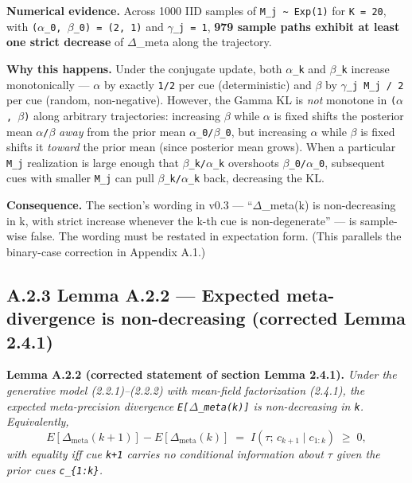 \documentclass{article}
\begin{document}
\textbf{Numerical evidence.} Across 1000 IID samples of
\texttt{M\_j\ \textasciitilde{}\ Exp(1)} for \texttt{K\ =\ 20}, with
\texttt{(\ensuremath{\alpha}\_0\textquotesingle{},\ \ensuremath{\beta}\_0\textquotesingle{})\ =\ (2,\ 1)}
and \texttt{\ensuremath{\gamma}\_j\ =\ 1}, \textbf{979 sample paths exhibit at least one
strict decrease} of \ensuremath{\Delta}\_meta along the trajectory.

\textbf{Why this happens.} Under the conjugate update, both
\texttt{\ensuremath{\alpha}\_k} and \texttt{\ensuremath{\beta}\_k} increase monotonically --- \texttt{\ensuremath{\alpha}} by
exactly \texttt{1/2} per cue (deterministic) and \texttt{\ensuremath{\beta}} by
\texttt{\ensuremath{\gamma}\_j\ M\_j\ /\ 2} per cue (random, non-negative). However, the
Gamma KL is \emph{not} monotone in \texttt{(\ensuremath{\alpha},\ \ensuremath{\beta})} along arbitrary
trajectories: increasing \texttt{\ensuremath{\beta}} while \texttt{\ensuremath{\alpha}} is fixed shifts the
posterior mean \texttt{\ensuremath{\alpha}/\ensuremath{\beta}} \emph{away} from the prior mean
\texttt{\ensuremath{\alpha}\_0/\ensuremath{\beta}\_0}, but increasing \texttt{\ensuremath{\alpha}} while \texttt{\ensuremath{\beta}} is fixed
shifts it \emph{toward} the prior mean (since posterior mean grows).
When a particular \texttt{M\_j} realization is large enough that
\texttt{\ensuremath{\beta}\_k/\ensuremath{\alpha}\_k} overshoots \texttt{\ensuremath{\beta}\_0/\ensuremath{\alpha}\_0}, subsequent cues with
smaller \texttt{M\_j} can pull \texttt{\ensuremath{\beta}\_k/\ensuremath{\alpha}\_k} back, decreasing the
KL.

\textbf{Consequence.} The section's wording in v0.3 --- ``\ensuremath{\Delta}\_meta(k) is
non-decreasing in k, with strict increase whenever the k-th cue is
non-degenerate'' --- is sample-wise false. The wording must be restated
in expectation form. (This parallels the binary-case correction in
Appendix A.1.)

\subsection{A.2.3 Lemma A.2.2 --- Expected meta-divergence is
non-decreasing (corrected Lemma
2.4.1)}\label{a.2.3-lemma-a.2.2-expected-meta-divergence-is-non-decreasing-corrected-lemma-2.4.1}

\textbf{Lemma A.2.2 (corrected statement of section Lemma 2.4.1).}
\emph{Under the generative model (2.2.1)--(2.2.2) with mean-field
factorization (2.4.1), the expected meta-precision divergence
\texttt{E{[}\ensuremath{\Delta}\_meta(k){]}} is non-decreasing in \texttt{k}.
Equivalently,} \[
E[\Delta_{\mathrm{meta}}(k+1)] - E[\Delta_{\mathrm{meta}}(k)] \;=\; I(\tau;\, c_{k+1} \mid c_{1:k}) \;\geq\; 0,
\] \emph{with equality iff cue \texttt{k+1} carries no conditional
information about \texttt{\ensuremath{\tau}} given the prior cues \texttt{c\_\{1:k\}}.}
\end{document}
